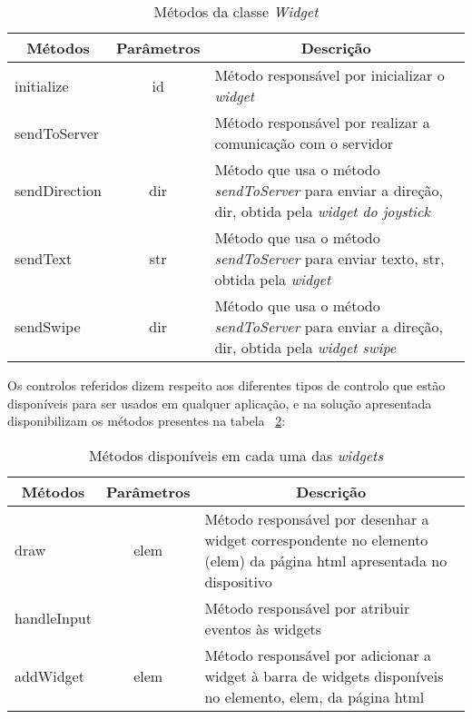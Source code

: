 	\begin{table}[ht]
 	\renewcommand{\arraystretch}{1.5}
	\centering
	\caption{Métodos da classe \textit{Widget}}
	\begin{tabular}{ p{2cm} p{2cm} p{10cm}  }
	\hline
	\multicolumn{1}{c}{\textbf{Métodos}} & \multicolumn{1}{c}{\textbf{Parâmetros}} & \multicolumn{1}{c}{\textbf{Descrição}} \\
	\hline
	initialize & \multicolumn{1}{c}{id} &Método responsável por inicializar o \textit{widget} \\
	\hline
	sendToServer & \multicolumn{1}{c}{} &Método responsável por realizar a comunicação com o servidor \\
	\hline
	sendDirection & \multicolumn{1}{c}{dir} &Método que usa o método \textit{sendToServer} para enviar a direção, dir, obtida pela \textit{widget do joystick} \\
	\hline
	sendText & \multicolumn{1}{c}{str} &Método que usa o método \textit{sendToServer} para enviar texto, str, obtida pela \textit{widget}  \\
	\hline
	sendSwipe & \multicolumn{1}{c}{dir} &Método que usa o método \textit{sendToServer} para enviar a direção, dir, obtida pela \textit{widget swipe}  \\
	\hline
	\end{tabular}
	\label{table:widget_met}
	\end{table}

	Os controlos referidos dizem respeito aos diferentes tipos de controlo que estão disponíveis para ser usados em qualquer aplicação, e na solução apresentada disponibilizam os métodos presentes na tabela ~\ref{table:metodos}:

 	\begin{table}[ht]
 	\renewcommand{\arraystretch}{1.5}
	\centering
	\caption{Métodos disponíveis em cada uma das \textit{widgets}}
	\begin{tabular}{ p{2cm} p{2cm} p{10cm}  }
	\hline
	\multicolumn{1}{c}{\textbf{Métodos}} & \multicolumn{1}{c}{\textbf{Parâmetros}} & \multicolumn{1}{c}{\textbf{Descrição}} \\
	\hline
	draw & \multicolumn{1}{c}{elem} &Método responsável por desenhar a widget correspondente no elemento (elem) da página html apresentada no dispositivo \\
	\hline
	handleInput & \multicolumn{1}{c}{} &Método responsável por atribuir eventos às widgets \\
	\hline
	addWidget & \multicolumn{1}{c}{elem} &Método responsável por adicionar a widget à barra de widgets disponíveis no elemento, elem, da página html \\
	\hline
	\end{tabular}

	\label{table:metodos}
	\end{table}


